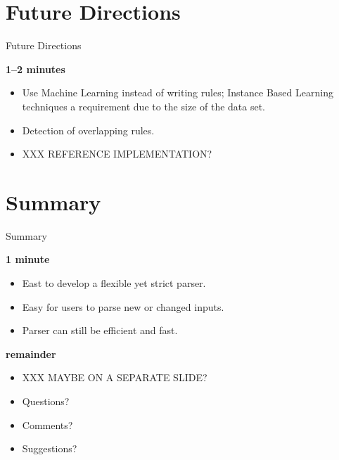 \documentclass{beamer}
\newcommand{\timingnote}[1]{%
    \textbf{#1}%
}
\begin{document}
\section{Future Directions}

\begin{frame}{Future Directions}

    \timingnote{1--2 minutes}

    \begin{itemize}

        \item Use Machine Learning instead of writing rules; Instance Based
            Learning techniques a requirement due to the size of the data
            set.

        \item Detection of overlapping rules.

        \item XXX REFERENCE IMPLEMENTATION\@?

    \end{itemize}

\end{frame}


\section*{Summary}

\begin{frame}{Summary}

    \timingnote{1 minute}

    \begin{itemize}

        \item East to develop a flexible yet strict parser.

        \item Easy for users to parse new or changed inputs.

        \item Parser can still be efficient and fast.

    \end{itemize}

    \timingnote{remainder}

    \begin{itemize}

        \item XXX MAYBE ON A SEPARATE SLIDE\@?

        \item Questions?

        \item Comments?

        \item Suggestions?

    \end{itemize}

\end{frame}
\end{document}

